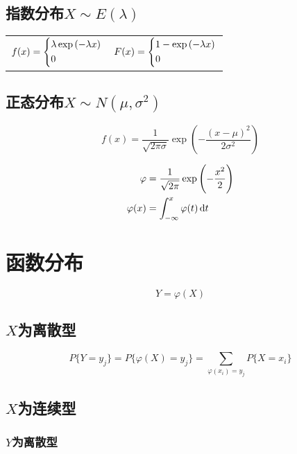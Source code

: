 \subsection{指数分布$X \sim E(\lambda)$}
\label{sub:指数分布}

\begin{tabular}{l|r}
    $f(x) =
    \begin{dcases}
        \lambda \exp\left( -\lambda x \right) \\
        0
    \end{dcases} $ &
    $ F(x) =
    \begin{dcases}
        1 - \exp\left( -\lambda x \right) \\
        0
    \end{dcases} $
\end{tabular}

\subsection{正态分布$X \sim N(\mu, \sigma^2)$}
\label{sub:正态分布}
\[
    f(x) = \frac{1}{\sqrt{2\pi\sigma}} \exp\left( - \frac{(x-\mu)^2}{2\sigma^2} \right)
\]

\begin{align}
    \varphi &= \frac{1}{\sqrt{2\pi}} \exp\left( - \frac{x^2}{2} \right) \\
    \varphi(x) &= \int_{-\infty}^x \varphi(t)\dif t
\end{align}

\section{函数分布}
\label{sec:函数分布}

\[
    Y = \varphi(X)
\]

\subsection{$X$为离散型}
\label{sub:_x_为离散型}

\[
    P\{Y = y_j\} = P\{\varphi(X) = y_j\} = \sum_{\varphi(x_i)=y_j} P\{X = x_i\}
\]

\subsection{$X$为连续型}
\label{sub:_x_为连续型}

\subsubsection{$Y$为离散型}
\label{ssub:_y_为离散型}

